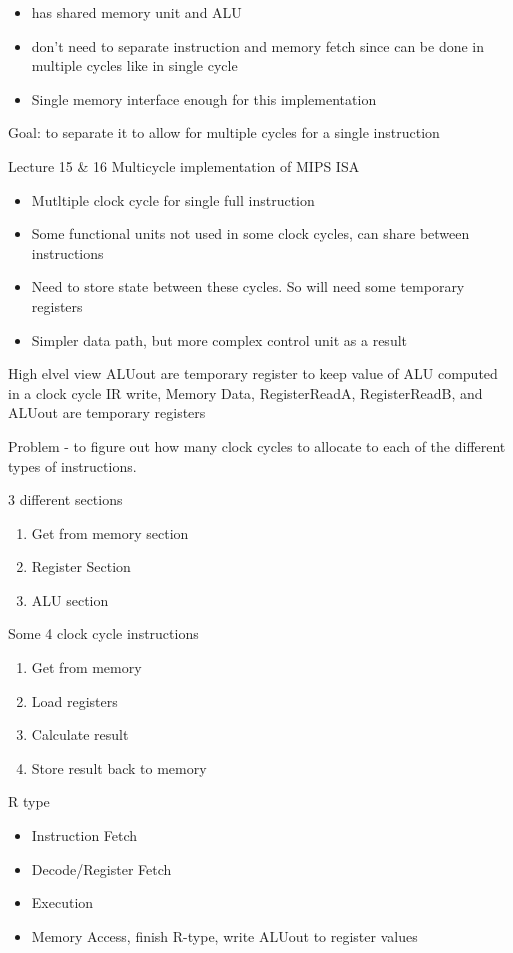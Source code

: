 \documentclass{article}
\begin{document}
		\begin{itemize}
			\item has shared memory unit and ALU
			\item don't need to separate instruction and memory fetch since can be done in multiple cycles like in single cycle
			\item Single memory interface enough for this implementation
		\end{itemize}

			Goal: to separate it to allow for multiple cycles for a single instruction

Lecture 15 \& 16
	Multicycle implementation of MIPS ISA
		\begin{itemize}
			\item Mutltiple clock cycle for single full instruction
			\item Some functional units not used in some clock cycles, can share between instructions
			\item Need to store state between these cycles. So will need some temporary registers
			\item Simpler data path, but more complex control unit as a result
		\end{itemize}

	High elvel view
		ALUout are temporary register to keep value of ALU computed in a clock cycle
		IR write, Memory Data, RegisterReadA, RegisterReadB, and ALUout are temporary registers
		
		Problem - to figure out how many clock cycles to allocate to each of the different types of instructions.

		3 different sections 
		\begin{enumerate}
			\item Get from memory section
			\item Register Section
			\item ALU section
		\end{enumerate}

		Some 4 clock cycle instructions
		\begin{enumerate}
			\item Get from memory
			\item Load registers
			\item Calculate result
			\item Store result back to memory
		\end{enumerate}

		R type
		\begin{itemize}
			\item Instruction Fetch
			\item Decode/Register Fetch
			\item Execution
			\item Memory Access, finish R-type, write ALUout to register values
		\end{itemize}
\end{document}
